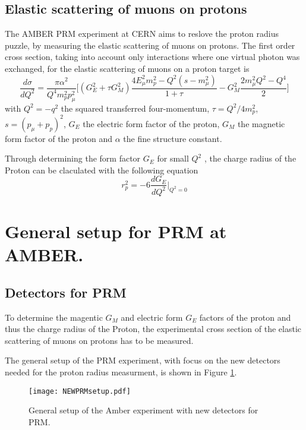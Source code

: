 \subsection{Elastic scattering of muons on protons}
The AMBER PRM experiment at CERN aims to reslove the proton radius puzzle, by measuring the elastic scattering of muons on protons.
The first order cross section, taking into account only interactions where one virtual photon was exchanged, 
for the elastic scattering of muons on a proton target is 
\begin{equation}
\label{eq:cross_section}
\frac{d\sigma}{dQ^2} = \frac{\pi \alpha^2}{Q^4 m_p^2 p_\mu^2} \bigg[ \left( G_E^2 + \tau G_M^2 \right) \frac{ 4E_\mu^2 m_p^2 
- Q^2 (s - m_\mu^2)}{1 + \tau }  - G_M^2 \frac{ 2m_\mu^2 Q^2 - Q^4}{2} \bigg]
\end{equation}
with  $Q^2 = -q^2$ 	the squared transferred four-momentum, $\tau = Q^2 / 4m_p^2$, $s = (p_\mu + p_p)^2$, 
 $G_E$ the electric form factor of the proton,
  $G_M$ the magnetic form factor of the proton and $\alpha$ the fine structure constant.\autocite{intentAmber}
  
Through determining the form factor $G_E$ for small $Q^2$ , the charge radius of the Proton can be claculated with the following equation\autocite{intentAmber}
\begin{equation}
\label{eq:charge_radius}
r_p^2 = -6 \frac{dG_E}{dQ^2} \bigg|_{Q^2 = 0}
\end{equation}

\section{General setup for PRM at AMBER.}\label{sec:general_setup}
\subsection{Detectors for PRM}

To determine the magentic $G_M$ and electric form $G_E$ factors of the proton and thus the charge radius of the Proton,
 the experimental cross section of the elastic scattering of muons on protons has to be measured.

The general setup of the PRM experiment, with focus on the new detectors needed for the proton radius measurment, is shown in Figure \ref{fig:amber_setup}.
\begin{figure}[H]
	\centering
	\texttt{[image: NEWPRMsetup.pdf]}
	\caption{General setup of the Amber experiment with new detectors for PRM.\autocite{InternalcommunicationKarl}}
	\label{fig:amber_setup}
\end{figure}

